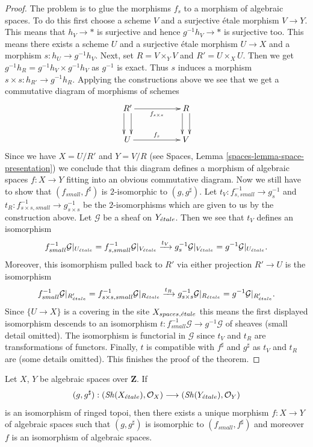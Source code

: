 \begin{proof}
\medskip\noindent
The problem is to glue the morphisms $f_s$ to a morphism of algebraic
spaces. To do this first choose a scheme $V$ and a surjective \'etale
morphism $V \to Y$. This means that $h_V \to *$ is surjective and hence
$g^{-1}h_V \to *$ is surjective too. This means there exists a scheme $U$
and a surjective \'etale morphism $U \to X$ and a morphism
$s : h_U \to g^{-1}h_V$. Next, set $R = V \times_Y V$ and
$R' = U \times_X U$. Then we get
$g^{-1}h_R = g^{-1}h_V \times g^{-1}h_V$ as $g^{-1}$ is exact.
Thus $s$ induces a morphism $s \times s : h_{R'} \to g^{-1}h_R$.
Applying the constructions above we see that we get a
commutative diagram of morphisms of schemes
$$
\xymatrix{
R' \ar@<1ex>[d] \ar@<-1ex>[d] \ar[rr]_{f_{s \times s}} & &
R \ar@<1ex>[d] \ar@<-1ex>[d] \\
U \ar[rr]^{f_s} & &
V
}
$$
Since we have $X = U/R'$ and $Y = V/R$ (see
Spaces, Lemma \ref{spaces-lemma-space-presentation})
we conclude that this diagram
defines a morphism of algebraic spaces $f : X \to Y$ fitting
into an obvious commutative diagram.
Now we still have to show that $(f_{small}, f^\sharp)$ is
$2$-isomorphic to $(g, g^\sharp)$.
Let $t_V : f_{s, small}^{-1} \to g_s^{-1}$ and
$t_R : f_{s \times s, small}^{-1} \to g_{s \times s}^{-1}$ be
the $2$-isomorphisms which are given to us by the construction above.
Let $\mathcal{G}$ be a sheaf on $Y_{\acute{e}tale}$. Then we see that
$t_V$ defines an isomorphism
$$
f_{small}^{-1}\mathcal{G}|_{U_{\acute{e}tale}}
=
f_{s, small}^{-1}\mathcal{G}|_{V_{\acute{e}tale}}
\xrightarrow{t_V}
g_s^{-1}\mathcal{G}|_{V_{\acute{e}tale}}
=
g^{-1}\mathcal{G}|_{U_{\acute{e}tale}}.
$$
Moreover, this isomorphism pulled back to $R'$ via either projection
$R' \to U$ is the isomorphism
$$
f_{small}^{-1}\mathcal{G}|_{R'_{\acute{e}tale}}
=
f_{s \times s, small}^{-1}\mathcal{G}|_{R_{\acute{e}tale}}
\xrightarrow{t_R}
g_{s \times s}^{-1}\mathcal{G}|_{R_{\acute{e}tale}}
=
g^{-1}\mathcal{G}|_{R'_{\acute{e}tale}}.
$$
Since $\{U \to X\}$ is a covering in the site $X_{spaces, {\acute{e}tale}}$
this means the first displayed isomorphism descends to an isomorphism
$t : f_{small}^{-1}\mathcal{G} \to g^{-1}\mathcal{G}$
of sheaves (small detail omitted). The isomorphism is functorial
in $\mathcal{G}$ since $t_V$ and $t_R$ are transformations of functors.
Finally, $t$ is compatible with $f^\sharp$ and $g^\sharp$ as
$t_V$ and $t_R$ are (some details omitted).
This finishes the proof of the theorem.
\end{proof}

\begin{lemma}
\label{lemma-isomorphism-ringed-topoi}
Let $X$, $Y$ be algebraic spaces over $\mathbf{Z}$. If
$$
(g, g^\sharp) :
(\mathop{\mathit{Sh}}\nolimits(X_{\acute{e}tale}), \mathcal{O}_X)
\longrightarrow
(\mathop{\mathit{Sh}}\nolimits(Y_{\acute{e}tale}), \mathcal{O}_Y)
$$
is an isomorphism of ringed topoi, then there exists a unique
morphism $f : X \to Y$ of algebraic spaces such that
$(g, g^\sharp)$ is isomorphic to $(f_{small}, f^\sharp)$
and moreover $f$ is an isomorphism of algebraic spaces.
\end{lemma}

